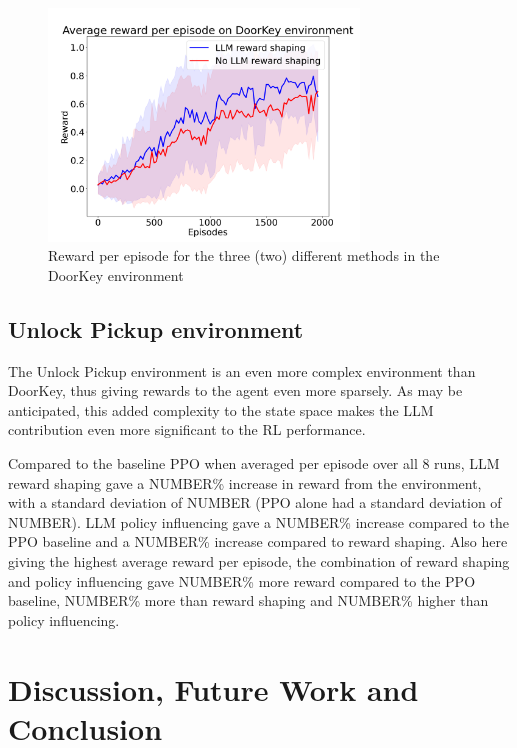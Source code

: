 \documentclass[conference]{IEEEtran}
\begin{document}
\begin{figure}[h]
\centerline{\includegraphics[width=3.25in]{figure/doorkeyresults.png}}
\caption{Reward per episode for the three (two) different methods in the DoorKey environment}
\label{doorkeyresults}
\end{figure}

\subsection{Unlock Pickup environment}

The Unlock Pickup environment is an even more complex environment than DoorKey, thus giving rewards to the agent even more sparsely. As may be anticipated, this added complexity to the state space makes the LLM contribution even more significant to the RL performance.

Compared to the baseline PPO when averaged per episode over all 8 runs, LLM reward shaping gave a NUMBER\% increase in reward from the environment, with a standard deviation of NUMBER (PPO alone had a standard deviation of NUMBER). LLM policy influencing gave a NUMBER\% increase compared to the PPO baseline and a NUMBER\% increase compared to reward shaping. Also here giving the highest average reward per episode, the combination of reward shaping and policy influencing gave NUMBER\% more reward compared to the PPO baseline, NUMBER\% more than reward shaping and NUMBER\% higher than policy influencing.

\section{Discussion, Future Work and Conclusion}


\end{document}
